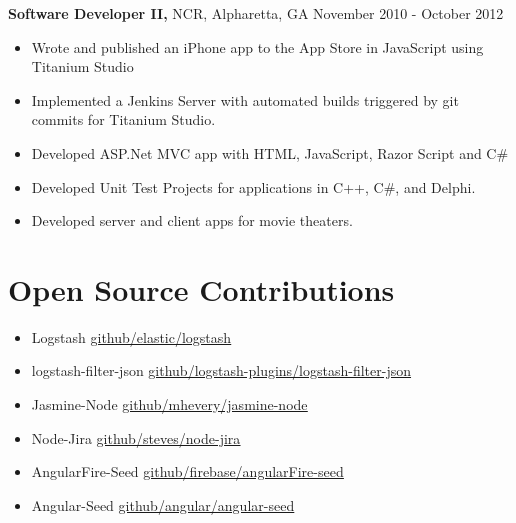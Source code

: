 \documentclass[margin]{res}
\begin{document}
\begin{resume}
    {\bf Software Developer II,} NCR, Alpharetta, GA \hfill November 2010 - October
    2012
        \begin{itemize} \itemsep -2pt
            \item Wrote and published an iPhone app to the App Store in JavaScript
                using Titanium Studio
            \item Implemented a Jenkins Server with automated builds triggered by
                git commits for Titanium Studio.
            \item Developed ASP.Net MVC app with HTML, JavaScript, Razor Script and
                C\#
            \item Developed Unit Test Projects for applications in C++, C\#, and
                Delphi.
            \item Developed server and client apps for movie theaters.
        \end{itemize}

\section{Open Source Contributions}
    \begin{itemize}
        \item Logstash
            \href{https://github.com/elastic/logstash}{\underline{github/elastic/logstash}}
        \item logstash-filter-json
            \href{https://github.com/logstash-plugins/logstash-filter-json}{\underline{github/logstash-plugins/logstash-filter-json}}
        \item Jasmine-Node
            \href{https://github.com/mhevery/jasmine-node}{\underline{github/mhevery/jasmine-node}}
        \item Node-Jira
            \href{https://github.com/steves/node-jira}{\underline{github/steves/node-jira}}
        \item AngularFire-Seed
            \href{https://github.com/firebase/angularFire-seed}{\underline{github/firebase/angularFire-seed}}
        \item Angular-Seed
            \href{https://github.com/angular/angular-seed}{\underline{github/angular/angular-seed}}
    \end{itemize}


\end{resume}
\end{document}
